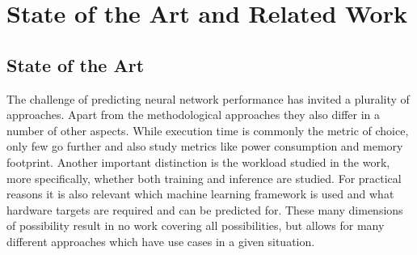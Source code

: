 \chapter{State of the Art and Related Work}\label{chap:sota}



\section{State of the Art}
The challenge of predicting neural network performance has invited a plurality of approaches.
Apart from the methodological approaches they also differ in a number of other aspects.
While execution time is commonly the metric of choice, only few go further and also study metrics
like power consumption and memory footprint. Another important distinction is the workload studied
in the work, more specifically, whether both training and inference are studied.
For practical reasons it is also relevant which machine learning framework is used and what hardware
targets are required and can be predicted for. These many dimensions of possibility result in no work
covering all possibilities, but allows for many different approaches which have use cases in a given
situation.

